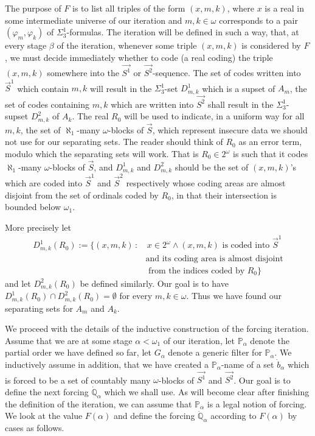 \documentclass[a4paper,11pt]{article}
\newcommand{\forceP}{\mathbb{P}}
\newcommand{\forceQ}{\mathbb{Q}}
\begin{document}
The purpose of $F$ is to list all triples of the form $(x,m,k)$, where $x$ is a real in some intermediate universe of our iteration and $m,k \in \omega$ corresponds to a pair $(\varphi_m,\varphi_k)$ of $\Sigma^1_3$-formulas. The iteration will be defined in such a way, that, at every stage $\beta$ of the iteration, whenever some triple $(x,m,k)$ is considered by $F$, we must decide immediately whether to code (a real coding) the triple $(x,m,k)$ somewhere into the $\vec{S^1}$ or $\vec{S^2}$-sequence. The set of codes written into $\vec{S}^1$ which contain $m,k$ will result in the $\Sigma^1_3$-set $D^1_{m,k}$ which is a supset of $A_m$, the set of codes containing $m,k$ which are written into $\vec{S^2}$ shall result in the $\Sigma^1_3$-supset $D^2_{m,k}$ of $A_k$. The real $R_0$ will be used to indicate, in a uniform way for all $m,k$, the set of $\aleph_1$-many $\omega$-blocks of $\vec{S}$, which represent insecure data  we should not use for our separating sets.
The reader should think of $R_0$ as an error term, modulo which the separating sets will work.
That is $R_0 \in 2^{\omega}$ is such that it codes $\aleph_1$-many $\omega$-blocks of $\vec{S}$, and $D^1_{m,k}$ and $D^2_{m,k}$ should be the set of $(x,m,k)$'s which are coded into $\vec{S}^1$ and $\vec{S}^2$ respectively whose coding areas are almost disjoint from the set of ordinals coded by $R_0$, in that their intersection is bounded below $\omega_1$.
 
 More precisely 
let \begin{align*}
 D^1_{m,k} (R_0):= \{ (x,m,k) \, : &\, x \in 2^{\omega} \land (x,m,k) \text{ is coded into } \vec{S}^1  \\&\text{and its coding area is almost disjoint} \\&\text{ from the indices coded by $R_0$} \}
\end{align*}
and let $D^2_{m,k}(R_0)$ be defined similarly.  Our goal is to have $D^1_{m,k}(R_0) \cap D^2_{m,k}(R_0) = \emptyset$ for every $m,k \in \omega$. Thus we have found our separating sets for $A_m$ and $A_k$.

We proceed with the details of the inductive construction of the forcing iteration.
Assume that we are at some stage $\alpha < \omega_1$ of our iteration, let $\forceP_{\alpha}$ denote the partial order we have defined so far, let $G_{\alpha}$ denote a generic filter for $\forceP_{\alpha}$. We inductively assume in addition, that we have created a $\forceP_{\alpha}$-name of a set $\dot{b}_{\alpha}$ which is forced to be a set of countably many $\omega$-blocks of $\vec{S^1}$ and $\vec{S^2}$. Our goal is to define the next forcing $\dot{\forceQ}_{\alpha}$ which we shall use.
As will become clear after finishing the definition of the iteration, we can assume that $\forceP_{\alpha}$ is a legal notion of forcing.
We look at the value $F(\alpha)$ and define the forcing $\dot{\forceQ}_{\alpha}$
according to $F(\alpha)$ by cases as follows.
\end{document}
